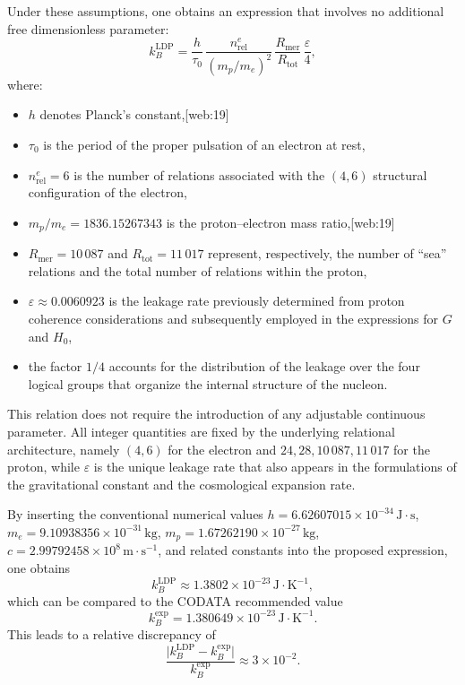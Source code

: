 \documentclass[11pt,a4paper]{article}
\begin{document}
Under these assumptions, one obtains an expression that involves no additional free dimensionless parameter:
\[
k_B^{\mathrm{LDP}}
= \frac{h}{\tau_0}\,
  \frac{n_{\mathrm{rel}}^{e}}{(m_p/m_e)^{2}}\,
  \frac{R_{\mathrm{mer}}}{R_{\mathrm{tot}}}\,
  \frac{\varepsilon}{4},
\]
where:
\begin{itemize}[label=-]
  \item \(h\) denotes Planck’s constant,[web:19]
  \item \(\tau_0\) is the period of the proper pulsation of an electron at rest,
  \item \(n_{\mathrm{rel}}^{e} = 6\) is the number of relations associated with the \((4,6)\) structural configuration of the electron,
  \item \(m_p/m_e = 1836.15267343\) is the proton–electron mass ratio,[web:19]
  \item \(R_{\mathrm{mer}} = 10\,087\) and \(R_{\mathrm{tot}} = 11\,017\) represent, respectively, the number of “sea” relations and the total number of relations within the proton,
  \item \(\varepsilon \approx 0.0060923\) is the leakage rate previously determined from proton coherence considerations and subsequently employed in the expressions for \(G\) and \(H_0\),
  \item the factor \(1/4\) accounts for the distribution of the leakage over the four logical groups that organize the internal structure of the nucleon.
\end{itemize}

This relation does not require the introduction of any adjustable continuous parameter. All integer quantities are fixed by the underlying relational architecture, namely \((4,6)\) for the electron and \(24, 28, 10\,087, 11\,017\) for the proton, while \(\varepsilon\) is the unique leakage rate that also appears in the formulations of the gravitational constant and the cosmological expansion rate.

By inserting the conventional numerical values \(h = 6.62607015 \times 10^{-34}\,\mathrm{J \cdot s}\), \(m_e = 9.10938356 \times 10^{-31}\,\mathrm{kg}\), \(m_p = 1.67262190 \times 10^{-27}\,\mathrm{kg}\), \(c = 2.99792458 \times 10^{8}\,\mathrm{m \cdot s^{-1}}\), and related constants into the proposed expression, one obtains
\[
k_B^{\mathrm{LDP}} \approx 1.3802 \times 10^{-23}\,\mathrm{J \cdot K^{-1}},
\]
which can be compared to the CODATA recommended value
\[
k_B^{\mathrm{exp}} = 1.380649 \times 10^{-23}\,\mathrm{J \cdot K^{-1}}.
\]
This leads to a relative discrepancy of
\[
\frac{\lvert k_B^{\mathrm{LDP}} - k_B^{\mathrm{exp}} \rvert}{k_B^{\mathrm{exp}}}
\approx 3 \times 10^{-2}.
\]
\end{document}

